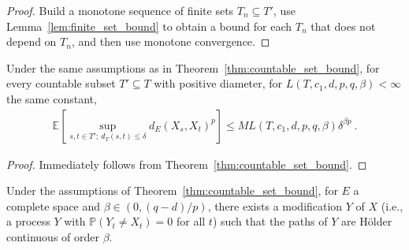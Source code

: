 \begin{proof}
Build a monotone sequence of finite sets $T_n \subseteq T'$, use Lemma~\ref{lem:finite_set_bound} to obtain a bound for each $T_n$ that does not depend on $T_n$, and then use monotone convergence.
\end{proof}


\begin{corollary}\label{cor:countable_set_bound_of_le}
Under the same assumptions as in Theorem~\ref{thm:countable_set_bound}, for every countable subset $T' \subseteq T$ with positive diameter, for $L(T, c_1, d, p, q, \beta) < \infty$ the same constant,
\begin{align*}
  \mathbb{E}\left[ \sup_{s, t \in T';\: d_T(s, t) \le \delta} d_E(X_s, X_t)^p \right]
  \le M L(T, c_1, d, p, q, \beta) \delta^{\beta p}
  \: .
\end{align*}
\end{corollary}

\begin{proof}
Immediately follows from Theorem~\ref{thm:countable_set_bound}.
\end{proof}


\begin{lemma}\label{lem:holder_modification_single}
Under the assumptions of Theorem~\ref{thm:countable_set_bound}, for $E$ a complete space and $\beta \in (0, (q - d)/p)$, there exists a modification $Y$ of $X$ (i.e., a process $Y$ with $\mathbb{P}(Y_t \ne X_t) = 0$ for all $t$) such that the paths of $Y$ are Hölder continuous of order $\beta$.
\end{lemma}

